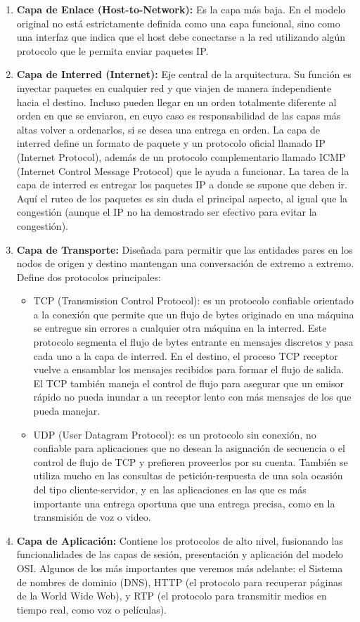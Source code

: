 \begin{enumerate}
  \item \textbf{Capa de Enlace (Host-to-Network):} Es la capa más baja. En el modelo original no está estrictamente definida como una capa funcional, sino como una interfaz que indica que el host debe conectarse a la red utilizando algún protocolo que le permita enviar paquetes IP.
  \item \textbf{Capa de Interred (Internet):} Eje central de la arquitectura. Su función es inyectar paquetes en cualquier red y que viajen de manera independiente hacia el destino. Incluso pueden llegar en un orden totalmente diferente al orden en que se enviaron, en cuyo caso es responsabilidad de las capas más altas volver a ordenarlos, si se desea una entrega en orden. La capa de interred define un formato de paquete y un protocolo oficial llamado IP (Internet Protocol), además de un protocolo complementario llamado ICMP (Internet Control Message Protocol) que le ayuda a funcionar. La tarea de la capa de interred es entregar los paquetes IP a donde se supone que deben ir. Aquí el ruteo de los paquetes es sin duda el principal aspecto, al igual que la congestión (aunque el IP no ha demostrado ser efectivo para evitar la congestión).
  \item \textbf{Capa de Transporte:} Diseñada para permitir que las entidades pares en los nodos de origen y destino mantengan una conversación de extremo a extremo. Define dos protocolos principales: 
  \begin{itemize}
    \item TCP (Transmission Control Protocol): es un protocolo confiable orientado a la conexión que permite que un flujo de bytes originado en una máquina se entregue sin errores a cualquier otra máquina en la interred. Este protocolo segmenta el flujo de bytes entrante en mensajes discretos y pasa cada uno a la capa de interred. En el destino, el proceso TCP receptor vuelve a ensamblar los mensajes recibidos para formar el flujo de salida. El TCP también maneja el control de flujo para asegurar que un emisor rápido no pueda inundar a un receptor lento con más mensajes de los que pueda manejar.
    \item UDP (User Datagram Protocol): es un protocolo sin conexión, no confiable para aplicaciones que no desean la asignación de secuencia o el control de flujo de TCP y prefieren proveerlos por su cuenta. También se utiliza mucho en las consultas de petición-respuesta de una sola ocasión del tipo cliente-servidor, y en las aplicaciones en las que es más importante una entrega oportuna que una entrega precisa, como en la transmisión de voz o video.
  \end{itemize}
  \item \textbf{Capa de Aplicación:} Contiene los protocolos de alto nivel, fusionando las funcionalidades de las capas de sesión, presentación y aplicación del modelo OSI. Algunos de los más importantes que veremos más adelante: el Sistema de nombres de dominio (DNS), HTTP (el protocolo para recuperar páginas de la World Wide Web), y RTP (el protocolo para transmitir medios en tiempo real, como voz o películas).
\end{enumerate}

